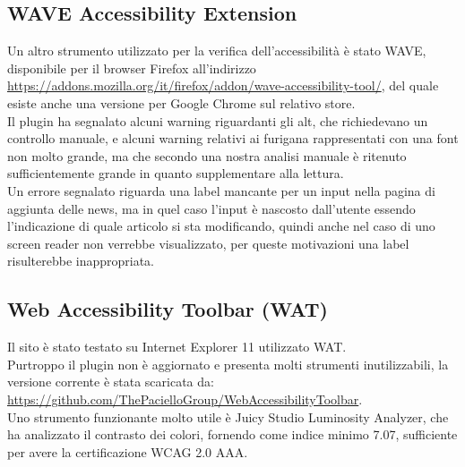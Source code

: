 \documentclass[openany, a4paper, 12pt]{report}
\begin{document}
			\subsection{WAVE Accessibility Extension}
				Un altro strumento utilizzato per la verifica dell'accessibilità è stato WAVE, disponibile per il browser Firefox all'indirizzo \url{https://addons.mozilla.org/it/firefox/addon/wave-accessibility-tool/}, del quale esiste anche una versione per Google Chrome sul relativo store.\\
				Il plugin ha segnalato alcuni warning riguardanti gli alt, che richiedevano un controllo manuale, e alcuni warning relativi ai furigana rappresentati con una font non molto grande, ma che secondo una nostra analisi manuale è ritenuto sufficientemente grande in quanto supplementare alla lettura.\\
				Un errore segnalato riguarda una label mancante per un input nella pagina di aggiunta delle news, ma in quel caso l'input è nascosto dall'utente essendo l'indicazione di quale articolo si sta modificando, quindi anche nel caso di uno screen reader non verrebbe visualizzato, per queste motivazioni una label risulterebbe inappropriata.
			\subsection{Web Accessibility Toolbar (WAT)}
				Il sito è stato testato su Internet Explorer 11 utilizzato WAT.\\
				Purtroppo il plugin non è aggiornato e presenta molti strumenti inutilizzabili, la versione corrente è stata scaricata da:\\ \url{https://github.com/ThePacielloGroup/WebAccessibilityToolbar}.\\
				Uno strumento funzionante molto utile è Juicy Studio Luminosity Analyzer, che ha analizzato il contrasto dei colori, fornendo come indice minimo 7.07, sufficiente per avere la certificazione WCAG 2.0 AAA.\\
			
\end{document}
